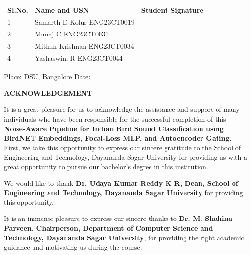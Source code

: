 \documentclass[a4paper,12pt]{article}
\begin{document}
\vspace{0.8cm}

\begin{tabular}{p{} p{} p{}}
\textbf{Sl.No.} & \textbf{Name and USN} & \textbf{Student Signature} \\[8pt]
1 & Samarth D Kolur \newline ENG23CT0019 & \\[12pt]
2 & Manoj C \newline ENG23CT0031 & \\[12pt]
3 & Mithun Krishnan \newline ENG23CT0034 & \\[12pt]
4 & Yashaswini R \newline ENG23CT0044 & \\
\end{tabular}

\vspace{1.5cm}

\noindent
\hspace{0.5cm} Place: DSU, Bangalore \hfill Date:

\newpage
\thispagestyle{plain}

\begin{center}
{\fontsize{18}{20}\bfseries ACKNOWLEDGEMENT}
\end{center}

\vspace{0.5cm}

\justify
\noindent
It is a great pleasure for us to acknowledge the assistance and support of many individuals who have been
responsible for the successful completion of this \textbf{Noise-Aware Pipeline for Indian Bird Sound
Classification using BirdNET Embeddings, Focal-Loss MLP, and Autoencoder Gating}. First, we take this
opportunity to express our sincere gratitude to the School of Engineering and Technology, Dayananda Sagar
University for providing us with a great opportunity to pursue our bachelor's degree in this institution.

\vspace{0.3cm}

\noindent
We would like to thank \textbf{Dr. Udaya Kumar Reddy K R, Dean, School of Engineering and Technology,
Dayananda Sagar University} for providing this opportunity.

\vspace{0.3cm}

\noindent
It is an immense pleasure to express our sincere thanks to \textbf{Dr. M. Shahina Parveen, Chairperson,
Department of Computer Science and Technology, Dayananda Sagar University}, for providing the right
academic guidance and motivating us during the course.
\end{document}

